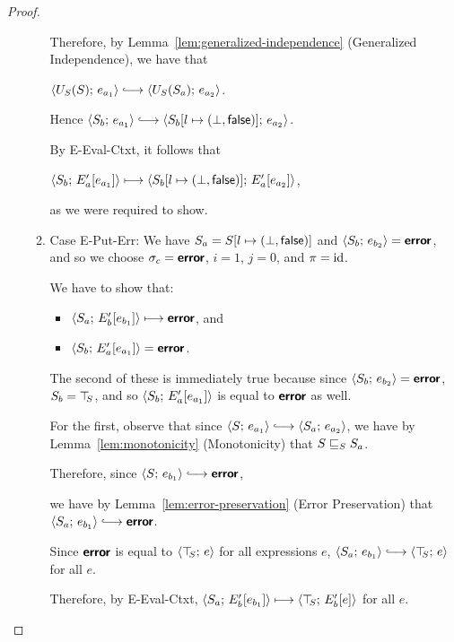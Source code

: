 \begin{proof}
\begin{enumerate}
\begin{enumerate}
      Therefore, by Lemma~\ref{lem:generalized-independence}
      (Generalized Independence), we have that

      $\config{U_S(S)}{e_{a_1}} \parstepsto
      \config{U_S(S_a)}{e_{a_2}}$.

      Hence $\config{S_b}{e_{a_1}}
      \parstepsto
      \config{\extS{S_b}{l}{\bot}{\frozenfalse}}{e_{a_2}}$.

      By {\sc E-Eval-Ctxt}, it follows that
      
      $\langle S_b;\, E'_a\hspace{-0.5mm}\left[e_{a_1}\right] \rangle \longmapsto
      \langle S_b[l \mapsto (\bot, \textsf{false})];\, E'_a\hspace{-0.5mm}\left[e_{a_2}\right] \rangle$,
      
      as we were required to show.

    \item \label{slqc-new-put-err}Case {\sc E-Put-Err}: We have $S_a =
      S[l \mapsto (\bot, \textsf{false})]$ and $\langle S_b;\, e_{b_2} \rangle =
      \textbf{\textsf{error}}$, and so we choose $\sigma_c = \textbf{\textsf{error}}$, $i = 1$, $j = 0$,
      and $\pi = \mathrm{id}$.

      We have to show that:
      \begin{itemize}
      \item $\langle S_a;\, E'_b\hspace{-0.5mm}\left[e_{b_1}\right] \rangle \longmapsto
        \textbf{\textsf{error}}$, and
      \item $\langle S_b;\, E'_a\hspace{-0.5mm}\left[e_{a_1}\right] \rangle = \textbf{\textsf{error}}$.
      \end{itemize}

      The second of these is immediately true because since
      $\langle S_b;\, e_{b_2} \rangle = \textbf{\textsf{error}}$, $S_b = \top\hspace{-0.85mm}_{S}$, and so
      $\langle S_b;\, E'_a\hspace{-0.5mm}\left[e_{a_1}\right] \rangle$ is equal to $\textbf{\textsf{error}}$ as
      well.

      For the first, observe that since $\config{S}{e_{a_1}}
      \parstepsto \config{S_a}{e_{a_2}}$, we have by
      Lemma~\ref{lem:monotonicity} (Monotonicity) that
      $S \sqsubseteq_S S_a$.

      Therefore, since $\config{S}{e_{b_1}} \parstepsto \error$,

      we have by Lemma~\ref{lem:error-preservation} (Error
      Preservation) that $\config{S_a}{e_{b_1}} \parstepsto \error$.

      Since $\textbf{\textsf{error}}$ is equal to $\langle \top\hspace{-0.85mm}_{S};\, e \rangle$ for all
      expressions $e$, $\config{S_a}{e_{b_1}} \parstepsto
      \config{\topS}{e}$ for all $e$.

      Therefore, by {\sc E-Eval-Ctxt},
      $\langle S_a;\, E'_b\hspace{-0.5mm}\left[e_{b_1}\right] \rangle \longmapsto
      \langle \top\hspace{-0.85mm}_{S};\, E'_b\hspace{-0.5mm}\left[e\right] \rangle$ for all $e$.


\end{enumerate}
\end{enumerate}
\end{proof}
